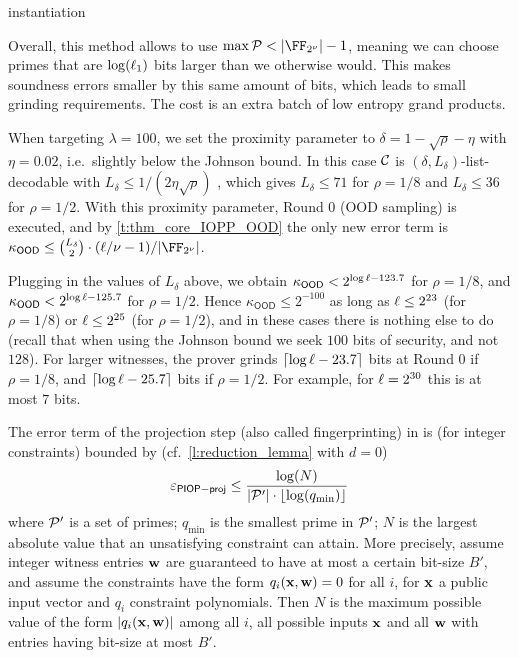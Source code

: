 \begin{lncsappendix}{instantiation}
\begin{remark}
    Overall, this method allows to use $\max\cP < |\comfield|-1$, meaning we can choose primes that are $\log(\ell_1)$ bits larger than we otherwise would. This makes soundness errors smaller by this same amount of bits, which leads to small grinding requirements.  The cost is an extra batch of low entropy grand products. 
\end{remark}



\begin{remark}\label{r:johnson_instantiation}
When targeting $\lambda=100$, we set the proximity parameter to $\delta=1-\sqrt{\rho}-\eta$ with $\eta=0.02$, i.e.\ slightly below the Johnson bound. In this case $\mathcal{C}$ is $(\delta,L_\delta)$-list-decodable with $L_\delta\leq 1/(2\eta\sqrt{\rho})$ \cite{GS99,stir}, which gives $L_\delta\leq 71$ for $\rho=1/8$ and $L_\delta\leq 36$ for $\rho=1/2$. With this proximity parameter, Round 0 (OOD sampling) is executed, and by \cref{t:thm_core_IOPP_OOD} the only new error term is $\kappa_{\mathsf{OOD}}\leq \binom{L_\delta}{2}\cdot (\codedim/\comfieldexp-1)/|\comfield|$.

Plugging in the values of $L_\delta$ above, we obtain $\kappa_{\mathsf{OOD}}<2^{\log\ell-123.7}$ for $\rho=1/8$, and $\kappa_{\mathsf{OOD}}<2^{\log\ell-125.7}$ for $\rho=1/2$. Hence $\kappa_{\mathsf{OOD}}\leq 2^{-100}$ as long as $\ell\leq 2^{23}$ (for $\rho=1/8$) or $\ell\leq 2^{25}$ (for $\rho=1/2$), and in these cases there is nothing else to do (recall that when using the Johnson bound we seek $100$ bits of security, and not $128$). For larger witnesses, the prover  grinds $\lceil \log\ell-23.7\rceil$ bits at Round 0 if $\rho=1/8$, and $\lceil \log\ell-25.7\rceil$ bits if $\rho=1/2$. For example, for $\ell=2^{30}$ this is at most $7$ bits.
\end{remark}

\begin{remark}\label{r:first_projection_security}
    The error term of the projection step (also called fingerprinting) in \cite{zincplus,zinc,zaratan} is (for integer constraints) bounded by (cf.\ \cref{l:reduction_lemma} with $d=0$)
    $$
    \varepsilon_{\mathsf{PIOP-proj}}\leq \frac{\log(N)}{|\mathcal{P}'| \cdot \lfloor\log(q_{\min})\rfloor}
    $$
    where $\mathcal{P}'$ is a set of primes; $q_{\min}$ is the smallest prime in $\mathcal{P}'$; $N$ is the largest  absolute value that an unsatisfying constraint can attain. More precisely, assume integer witness entries $\mathbf{w}$ are guaranteed to have at most a certain bit-size $B'$, and assume the constraints have the form $q_i(\mathbf{x},\mathbf{w})=0$ for all $i$, for $\mathbf{x}$ a public input vector and $q_i$ constraint polynomials. Then $N$ is the maximum possible value of the form $|q_i(\mathbf{x},\mathbf{w})|$ among all $i$, all possible inputs $\mathbf{x}$ and all  $\mathbf{w}$ with entries having bit-size at most $B'$. 
    

\end{remark}
\end{lncsappendix}
